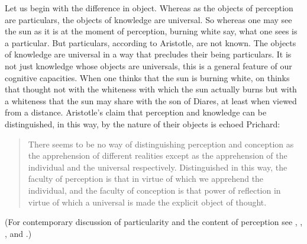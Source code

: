 Let us begin with the difference in object. Whereas as the objects of perception are particulars, the objects of knowledge are universal. So whereas one may see the sun as it is at the moment of perception, burning white say, what one sees is a particular. But particulars, according to Aristotle, are not known. The objects of knowledge are universal in a way that precludes their being particulars. It is not just knowledge whose objects are universals, this is a general feature of our cognitive capacities. When one thinks that the sun is burning white, on thinks that thought not with the whiteness with which the sun actually burns but with a whiteness that the sun may share with the son of Diares, at least when viewed from a distance. Aristotle's claim that perception and knowledge can be distinguished, in this way, by the nature of their objects is echoed Prichard:
% 	
\begin{quote}
	There seems to be no way of distinguishing perception and conception as the apprehension of different realities except as the apprehension of the individual and the universal respectively. Distinguished in this way, the faculty of perception is that in virtue of which we apprehend the individual, and the faculty of conception is that power of reflection in virtue of which a universal is made the explicit object of thought. \citep[]{Prichard:1909yg}
\end{quote}
(For contemporary discussion of particularity and the content of perception see \citealt{Brewer:2008fk}, \citealt{Martin:2002jb}, \citealt{Soteriou:2000iz,Soteriou:2005fk}, and \citealt{Travis:2005ys}.)

